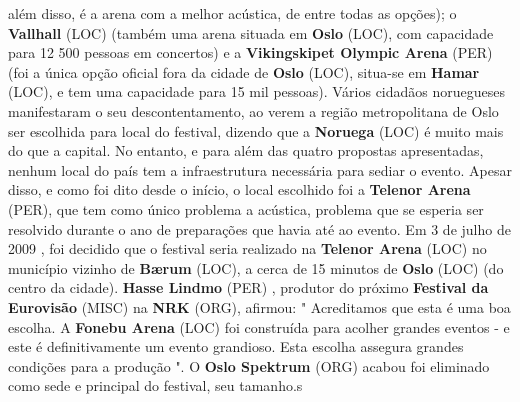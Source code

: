 \documentclass[12pt,a4paper]{article}
\begin{document}
além disso, é a arena com a melhor acústica, de entre todas as opções); o \textbf{Vallhall} (LOC) (também uma arena situada em \textbf{Oslo} (LOC), com capacidade para 12 500 pessoas em concertos) e a \textbf{Vikingskipet Olympic Arena} (PER) (foi a única opção oficial fora da cidade de \textbf{Oslo} (LOC), situa-se em \textbf{Hamar} (LOC), e tem uma capacidade para 15 mil pessoas). Vários cidadãos noruegueses manifestaram o seu descontentamento, ao verem a região metropolitana de Oslo ser escolhida para local do festival, dizendo que a \textbf{Noruega} (LOC) é muito mais do que a capital. No entanto, e para além das quatro propostas apresentadas, nenhum local do país tem a infraestrutura necessária para sediar o evento. Apesar disso, e como foi dito desde o início, o local escolhido foi a \textbf{Telenor Arena} (PER), que tem como único problema a acústica, problema que se esperia ser resolvido durante o ano de preparações que havia até ao evento. Em 3 de julho de 2009 , foi decidido que o festival seria realizado na \textbf{Telenor Arena} (LOC) no município vizinho de \textbf{Bærum} (LOC), a cerca de 15 minutos de \textbf{Oslo} (LOC) (do centro da cidade). \textbf{Hasse Lindmo} (PER) , produtor do próximo \textbf{Festival da Eurovisão} (MISC) na \textbf{NRK} (ORG), afirmou: " Acreditamos que esta é uma boa escolha. A \textbf{Fonebu Arena} (LOC) foi construída para acolher grandes eventos - e este é definitivamente um evento grandioso. Esta escolha assegura grandes condições para a produção ". O \textbf{Oslo Spektrum} (ORG) acabou foi eliminado como sede e principal do festival, seu tamanho.s
\end{document}
